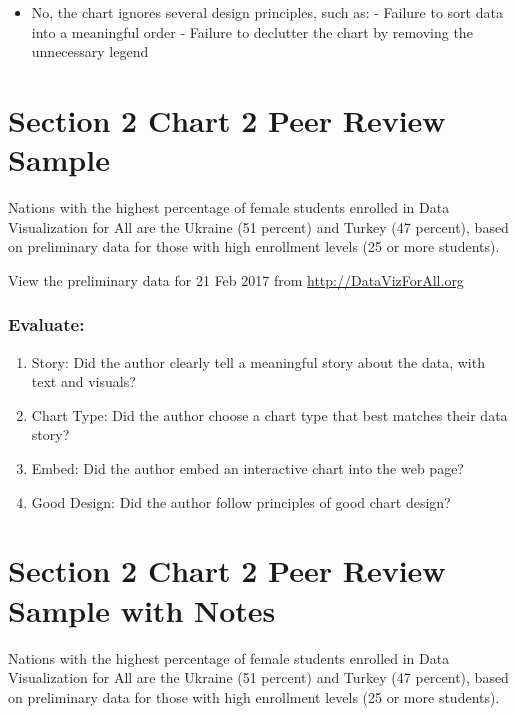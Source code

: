\documentclass[
  english,
]{book}
\providecommand{\tightlist}{%
  \setlength{\itemsep}{0pt}\setlength{\parskip}{0pt}}
\begin{document}
\begin{itemize}
\tightlist
\item
  No, the chart ignores several design principles, such as:
  - Failure to sort data into a meaningful order
  - Failure to declutter the chart by removing the unnecessary legend
\end{itemize}

\hypertarget{peer-2-chart-2}{%
\section{Section 2 Chart 2 Peer Review Sample}\label{peer-2-chart-2}}

Nations with the highest percentage of female students enrolled in Data Visualization for All are the Ukraine (51 percent) and Turkey (47 percent), based on preliminary data for those with high enrollment levels (25 or more students).

View the preliminary data for 21 Feb 2017 from \url{http://DataVizForAll.org}

\hypertarget{evaluate-2}{%
\subsubsection{Evaluate:}\label{evaluate-2}}

\begin{enumerate}
\def\labelenumi{\arabic{enumi}.}
\tightlist
\item
  Story: Did the author clearly tell a meaningful story about the data, with text and visuals?
\item
  Chart Type: Did the author choose a chart type that best matches their data story?
\item
  Embed: Did the author embed an interactive chart into the web page?
\item
  Good Design: Did the author follow principles of good chart design?
\end{enumerate}

\hypertarget{peer-2-chart-2-notes}{%
\section{Section 2 Chart 2 Peer Review Sample with Notes}\label{peer-2-chart-2-notes}}

Nations with the highest percentage of female students enrolled in Data Visualization for All are the Ukraine (51 percent) and Turkey (47 percent), based on preliminary data for those with high enrollment levels (25 or more students).
\end{document}

